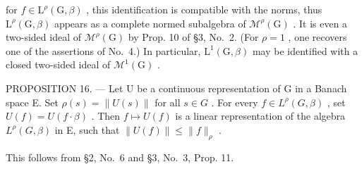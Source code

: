 for \(f \in \mathrm{L}^{\rho}(\mathrm{G},\beta)\) , this identification is compatible with the norms, thus \(\mathrm{L}^{\rho}(\mathrm{G},\beta)\) appears as a complete normed subalgebra of \(\mathcal{M}^{\rho}(\mathrm{G})\) . It is even a two-sided ideal of \(\mathcal{M}^{\rho}(\mathrm{G})\) by Prop. 10 of §3, No.~2. (For \(\rho = 1\) , one recovers one of the assertions of No.~4.) In particular, \(\mathrm{L}^{1}(\mathrm{G},\beta)\) may be identified with a closed two-sided ideal of \(\mathcal{M}^{1}(\mathrm{G})\) .

PROPOSITION 16. --- Let U be a continuous representation of G in a Banach space E. Set \(\rho(s) = \|U(s)\|\) for all \(s \in G\) . For every \(f \in L^{\rho}(G, \beta)\) , set \(U(f) = U(f \cdot \beta)\) . Then \(f \mapsto U(f)\) is a linear representation of the algebra \(L^{\rho}(G, \beta)\) in E, such that \(\|U(f)\| \leqslant \|f\|_{\rho}\) .

This follows from §2, No.~6 and §3, No.~3, Prop. 11.

